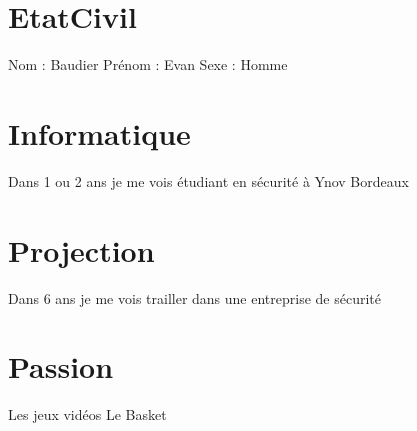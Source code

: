 \documentclass[a4paper,12pt]{article}
\begin{document}
\section{EtatCivil}
Nom : Baudier
\newline
Prénom : Evan
\newline
Sexe : Homme
\newline
\section{Informatique}
Dans 1 ou 2 ans je me vois étudiant en sécurité à Ynov Bordeaux
\section{Projection}
Dans 6 ans je me vois trailler dans une entreprise de sécurité
\section{Passion}
Les jeux vidéos
\newline
Le Basket
\end{document}
